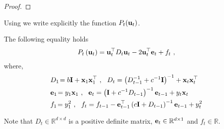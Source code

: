\begin{proof}
\QED
\end{proof}
Using  we write explicitly the function $P_t(\mathbf{u}_{t})$.
\begin{lemma}
\label{lem:lemma12}
The following equality holds
\begin{align*}
P_{t}\left(\mathbf{u}_{t}\right)={\mathbf{u}}^{\top}_{t}D_{t}\mathbf{u}_{t}-2{\mathbf{u}}^{\top}_{t}\mathbf{e}_{t}+f_{t}~,
\end{align*}
where,
\begin{align}
&D_{1} \!=b\mathbf{I}+\mathbf{x}_{1}{\mathbf{x}}^{\top}_{1}
~,~~
D_{t}=\left(D_{t-1}^{-1}+c^{-1}\mathbf{I}\right)^{-1}+\mathbf{x}_{t}{\mathbf{x}}^{\top}_{t}\label{D}\\
&\mathbf{e}_{1}\!=y_{1}\mathbf{x}_{1}~,~~
\mathbf{e}_{t}=\left(\mathbf{I}+c^{-1}D_{t-1}\right)^{-1}\mathbf{e}_{t-1}+y_{t}\mathbf{x}_{t}\label{e}\\
&f_{1}\!=y_{1}^{2}~,~~
f_{t}=f_{t-1}-\mathbf{e}^{\top}_{t-1}\left(c\mathbf{I}+D_{t-1}\right)^{-1}\mathbf{e}_{t-1}+y_{t}^{2}\label{f}
\end{align}
\end{lemma}
Note that $D_{t}\in\mathbb{R}^{d\times d}$ is a positive definite matrix,
$\mathbf{e}_{t}\in\mathbb{R}^{d\times1}$ and $f_{t}\in\mathbb{R}$.
